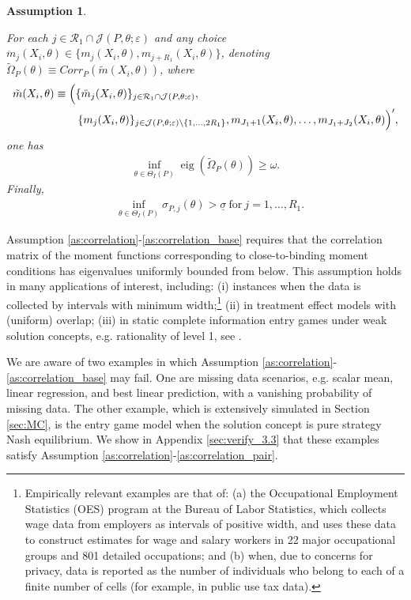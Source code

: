 \documentclass[letterpaper,11pt]{article}
\theoremstyle{myplain}
\theoremstyle{mydefinition}
\newtheorem{assumption}{Assumption}[section]
\theoremstyle{myremark}
\renewcommand{\cite}{\citet}
\newcommand{\eig}{\operatorname{eig}}
\newcommand{\cJ}{\mathcal{J}}
\newcommand{\cR}{\mathcal{R}}
\numberwithin{equation}{section}
\numberwithin{figure}{section}
\begin{document}
\begin{appendices}
\begin{assumption}
\begin{enumerate}
For each $j \in \cR_1\cap\cJ(P,\theta;\varepsilon)$ and any choice $\ddot{m}_j(X_i,\theta) \in \{m_{j}(X_i,\theta),m_{j+R_1}(X_i,\theta)\}$, denoting $\tilde\Omega_P(\theta)\equiv Corr_P(\tilde m(X_i,\theta))$, where
\begin{align*}
\tilde m(X_i,\theta)&\equiv \Big(\{\ddot{m}_j(X_i,\theta)\}_{j \in \cR_1 \cap \cJ(P,\theta;\varepsilon)},\\
& \hspace{0.75cm} \{m_j(X_i,\theta)\}_{j \in \cJ(P,\theta;\varepsilon) \setminus \{1,\dots,2R_1\}},m_{J_1+1}(X_i,\theta),\dots,m_{J_1+J_2}(X_i,\theta)\Big)',
\end{align*}
one has
\begin{align}
\inf_{\theta \in \Theta_I(P)}\eig(\tilde\Omega_P(\theta))\ge \omega.\label{eq:eig_cond_paired_ineq}
\end{align}
Finally,
\begin{align}
&\inf_{\theta \in \Theta_I(P)}\sigma_{P,j}(\theta)>\underline{\sigma}~ \text{for}~j=1,\dots,R_1.\label{eq:33primeiii}
\end{align}
\end{enumerate}
\end{assumption}
Assumption \ref{as:correlation}-\ref{as:correlation_base} requires that the correlation matrix of the moment functions corresponding to close-to-binding moment conditions has
eigenvalues uniformly bounded from below. 
This assumption holds in many applications of interest, including: (i) instances when the data is collected by intervals with minimum width;\footnote{\label{fn:interval_pos_width}
Empirically relevant examples are that of: (a) the Occupational Employment Statistics (OES) program at the Bureau of Labor Statistics, which collects wage data from employers as intervals of positive width, and uses these data to construct estimates for wage and salary workers in 22 major occupational groups and 801 detailed occupations; and (b) when, due to concerns for privacy, data is reported as the number of individuals who belong to each of a finite number of cells (for example, in public use tax data).}
(ii) in treatment effect models with (uniform) overlap;
(iii) in static complete information entry games under weak solution concepts, e.g. rationality of level 1, see \cite{ALT}. 

We are aware of two examples in which Assumption \ref{as:correlation}-\ref{as:correlation_base} may fail. 
One are missing data scenarios,
e.g. scalar mean, linear regression, and best linear prediction, with a vanishing probability of missing data. 
The other example, which is extensively simulated in Section \ref{sec:MC}, is the \cite{CilibertoTamer09} entry game model when the solution concept is pure strategy Nash equilibrium. We show in Appendix \ref{sec:verify_3.3} that these examples satisfy Assumption \ref{as:correlation}-\ref{as:correlation_pair}.



\end{appendices}
\end{document}
